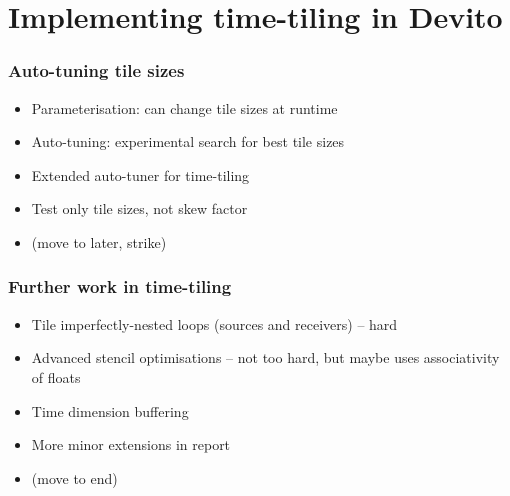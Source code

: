 \documentclass{beamer}
\begin{document}
\section{Implementing time-tiling in Devito}

%



\begin{frame}
\frametitle{Auto-tuning tile sizes}

\begin{itemize}
	\item Parameterisation: can change tile sizes at runtime
	\item Auto-tuning: experimental search for best tile sizes
	\item Extended auto-tuner for time-tiling
	\item Test only tile sizes, not skew factor
	\item (move to later, strike)
\end{itemize}
\end{frame}



\begin{frame}
\frametitle{Further work in time-tiling}

\begin{itemize}
	\item Tile imperfectly-nested loops (sources and receivers) -- hard
	\item Advanced stencil optimisations -- not too hard, but maybe uses associativity of floats \Sadey
	\item Time dimension buffering
	\item More minor extensions in report
	\item (move to end)
\end{itemize}
\end{frame}
\end{document}

